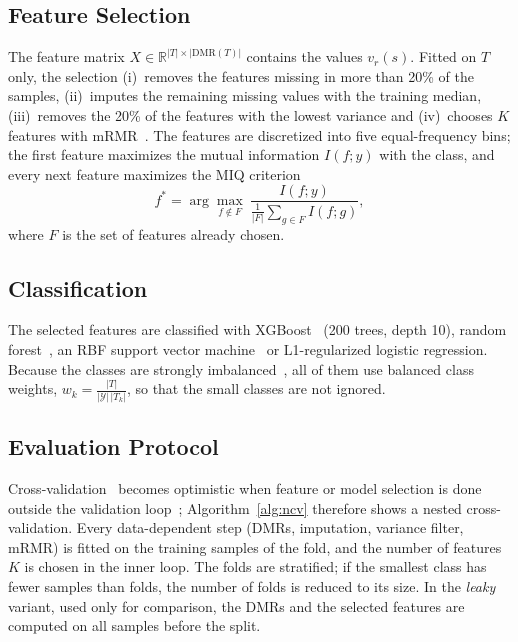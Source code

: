\documentclass[runningheads]{llncs}
\begin{document}
\subsection{Feature Selection}
The feature matrix $X\in\mathbb{R}^{|T|\times|\mathrm{DMR}(T)|}$ contains the values $v_r(s)$. Fitted on $T$ only, the selection (i)~removes the features missing in more than 20\% of the samples, (ii)~imputes the remaining missing values with the training median, (iii)~removes the 20\% of the features with the lowest variance and (iv)~chooses $K$ features with mRMR~\cite{ding2005}. The features are discretized into five equal-frequency bins; the first feature maximizes the mutual information $I(f;y)$ with the class, and every next feature maximizes the MIQ criterion
\[
f^{*}=\arg\max_{f\notin F}\ \frac{I(f;y)}{\frac{1}{|F|}\sum_{g\in F} I(f;g)},
\]
where $F$ is the set of features already chosen.

\subsection{Classification}
The selected features are classified with XGBoost~\cite{chen2016} (200 trees, depth 10), random forest~\cite{breiman2001}, an RBF support vector machine~\cite{cortes1995} or L1-regularized logistic regression. Because the classes are strongly imbalanced~\cite{he2009}, all of them use balanced class weights, $w_k=\frac{|T|}{|\mathcal{Y}|\,|T_k|}$, so that the small classes are not ignored.

\subsection{Evaluation Protocol}
Cross-validation~\cite{kohavi1995} becomes optimistic when feature or model selection is done outside the validation loop~\cite{varma2006,cawley2010}; Algorithm~\ref{alg:ncv} therefore shows a nested cross-validation. Every data-dependent step (DMRs, imputation, variance filter, mRMR) is fitted on the training samples of the fold, and the number of features $K$ is chosen in the inner loop. The folds are stratified; if the smallest class has fewer samples than folds, the number of folds is reduced to its size. In the \emph{leaky} variant, used only for comparison, the DMRs and the selected features are computed on all samples before the split.
\end{document}
